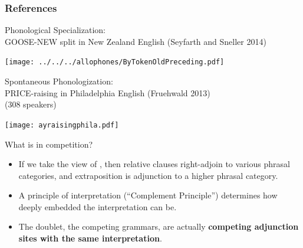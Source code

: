 \documentclass[hyperref={pdfpagelabels=false}]{beamer}
\begin{document}
\begin{frame}[allowframebreaks]
\frametitle{References}
\newcommand*{\newblock}{natbib}


\end{frame}




\begin{frame}{Phonological Specialization: \\ \small{GOOSE-NEW split in New Zealand English (Seyfarth and Sneller 2014)}}

\begin{center}
\texttt{[image: ../../../allophones/ByTokenOldPreceding.pdf]}
\end{center}
\end{frame}


\begin{frame}{Spontaneous Phonologization: \\ \small{PRICE-raising in Philadelphia English (Fruehwald 2013)\\(308 speakers)}}

	
\texttt{[image: ayraisingphila.pdf]}

\end{frame}


\begin{frame}{What is in competition?}
    \begin{itemize}
	\item If we take the view of \citet{culicoverrochemont1990}, then relative clauses right-adjoin to various phrasal categories, and extraposition is adjunction to a higher phrasal category.
	\item A principle of interpretation (``Complement Principle'') determines how deeply embedded the interpretation can be.
	\item The doublet, the competing grammars, are actually \textbf{competing adjunction sites with the same interpretation}.
	\end{itemize}
	
\end{frame}
\end{document}

